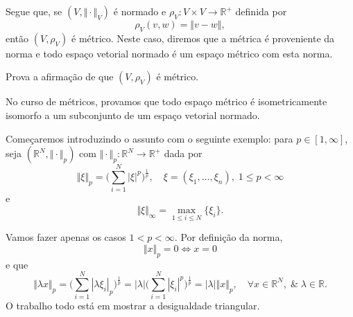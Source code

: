 \documentclass[../functional_analysis.tex]{subfiles}
\begin{document}
Segue que, se \((V, \Vert \cdot  \Vert_{V})\) é normado e \(\rho_{V}:V\times V\rightarrow \mathbb{R}^{+}\) definida por
\[
	\rho_{V}(v, w) = \Vert v-w \Vert,
\]
então \((V, \rho_{V})\) é métrico. Neste caso, diremos que a métrica é proveniente da norma e todo espaço vetorial normado é um espaço métrico com esta norma.
\begin{exr}
	Prova a afirmação de que \((V, \rho_V)\) é métrico.
\end{exr}
No curso de métricos, provamos que todo espaço métrico é isometricamente isomorfo a um subconjunto de um espaço vetorial normado.

Começaremos introduzindo o assunto com o seguinte exemplo: para \(p \in [1, \infty]\), seja \((\mathbb{R}^{N}, \Vert \cdot  \Vert_{p})\) com \(\Vert \cdot  \Vert_{p}:\mathbb{R}^{N}\rightarrow \mathbb{R}^{+}\) dada por
\[
	\Vert \xi  \Vert_{p} = \biggl(\sum\limits_{i=1}^{N}|\xi |^{p}\biggr)^{\frac{1}{p}},\quad \xi  = (\xi_1, \dotsc , \xi_n),\; 1\leq p < \infty
\]
e
\[
	\Vert \xi  \Vert_{\infty} = \max\limits_{1\leq i\leq N}\{\xi_{i}\}.
\]

Vamos fazer apenas os casos \(1 < p < \infty\). Por definição da norma,
\[
	\Vert x \Vert_{p} = 0 \Longleftrightarrow x =0
\]
e que
\[
	\Vert \lambda x \Vert_p = \biggl(\sum\limits_{i=1}^{N}|\lambda \xi_{i}|_p\biggr)^{\frac{1}{p}} = |\lambda |\biggl(\sum\limits_{i=1}^{N}|\xi_{i}|^{p}\biggr)^{\frac{1}{p}} = |\lambda | \Vert x \Vert_p, \quad \forall x\in \mathbb{R}^{N},\;\&\; \lambda \in \mathbb{R}.
\]
O trabalho todo está em mostrar a desigualdade triangular.
\end{document}
